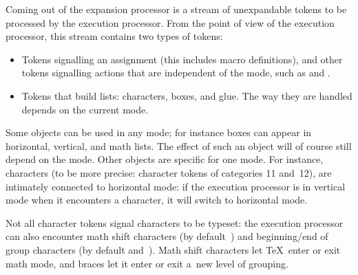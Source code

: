 \documentclass[letterpaper]{book}
\begin{document}
Coming out of the expansion processor is a stream of
unexpandable tokens to be processed by
the execution processor. 
\relax From the point of view of the execution processor, this
stream contains two types of tokens:
\begin{itemize}
\item Tokens signalling an assignment (this includes
      macro definitions), and
      other tokens signalling actions
      that are independent of the mode, such
      as  and .
\item Tokens that build lists:
      characters, boxes, and glue. The way they are handled
      depends on the current mode.
\end{itemize}

Some objects can be used in any mode; for instance boxes
can appear in horizontal, vertical, and math lists.
The effect of such an object will of course still depend on the mode.
Other objects are  specific for one mode.
For instance, characters (to be more precise:
character tokens of categories 11 and~12), 
are intimately connected to horizontal mode:
if the execution processor 
is in vertical mode when it encounters a character, it will
switch to horizontal mode.

Not all character tokens signal characters to be typeset:
the execution processor can also encounter math shift
characters (by default~) and beginning/end of group
characters (by default  and~).
Math shift characters let \TeX\ enter or exit
math mode, and braces let it enter or exit a~new level of
grouping.
\end{document}
